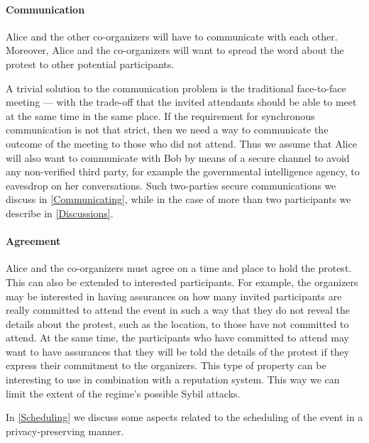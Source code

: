\paragraph{Communication}

Alice and the other co-organizers will have to communicate with each other.
Moreover, Alice and the co-organizers will want to spread the word about the 
protest to other potential participants.

A trivial solution to the communication problem is the traditional face-to-face 
meeting --- with the trade-off that the invited attendants should be able to 
meet at the same time in the same place.
If the requirement for synchronous communication is not that strict, then we 
need a way to communicate the outcome of the meeting to those who did not 
attend.
%
%
Thus we assume that Alice will also want to communicate with Bob by means of 
a secure channel to avoid any non-verified third party, for example the 
governmental intelligence agency, to eavesdrop on her conversations.
Such two-parties secure communications we discuss in \cref{Communicating}, 
while in the case of more than two participants we describe in 
\cref{Discussions}.

\paragraph{Agreement}

Alice and the co-organizers must agree on a time and place to hold the 
protest.
This can also be extended to interested participants.
For example, the organizers may be interested in having assurances on how many 
invited participants are really committed to attend the event in such a way 
that they do not reveal the details about the protest, such as the location, to 
those have not committed to attend.
At the same time, the participants who have committed to attend may want to 
have assurances that they will be told the details of the protest if they 
express their commitment to the organizers.
This type of property can be interesting to use in combination with 
a reputation system.
This way we can limit the extent of the regime's possible Sybil attacks.

In \cref{Scheduling} we discuss some aspects related to the scheduling of the 
event in a privacy-preserving manner.

